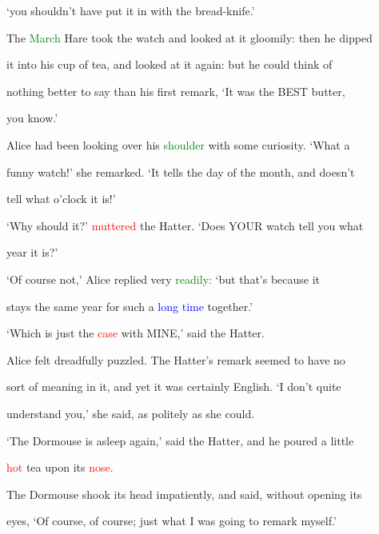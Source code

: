  ‘you shouldn’t have put it in with the bread-knife.’



 The \textcolor{green}{March} Hare took the \textcolor{BurntOrange}{watch} and looked at it gloomily: then he dipped

 it into his cup of tea, and looked at it again: but he could think of

 nothing better to say than his first remark, ‘It was the BEST butter,

 you know.’



 Alice had been looking over his \textcolor{green}{shoulder} with some \textcolor{BurntOrange}{curiosity.} ‘What a

 funny \textcolor{BurntOrange}{watch!’} she remarked. ‘It tells the day of the month, and doesn’t

 tell what o’clock it is!’



 ‘Why should it?’ \textcolor{red}{muttered} the Hatter. ‘Does YOUR \textcolor{BurntOrange}{watch} tell you what

 year it is?’



 ‘Of course not,’ Alice replied very \textcolor{green}{readily:} ‘but that’s because it

 stays the same year for such a \textcolor{blue}{long} \textcolor{blue}{time} together.’



 ‘Which is just the \textcolor{red}{case} with MINE,’ said the Hatter.



 Alice felt \textcolor{BurntOrange}{dreadfully} puzzled. The Hatter’s remark seemed to have no

 sort of meaning in it, and yet it was certainly English. ‘I don’t quite

 understand you,’ she said, as politely as she could.



 ‘The Dormouse is asleep again,’ said the Hatter, and he poured a little

 \textcolor{red}{hot} tea upon its \textcolor{red}{nose.}



 The Dormouse shook its head impatiently, and said, without opening its

 eyes, ‘Of course, of course; just what I was going to remark myself.’




